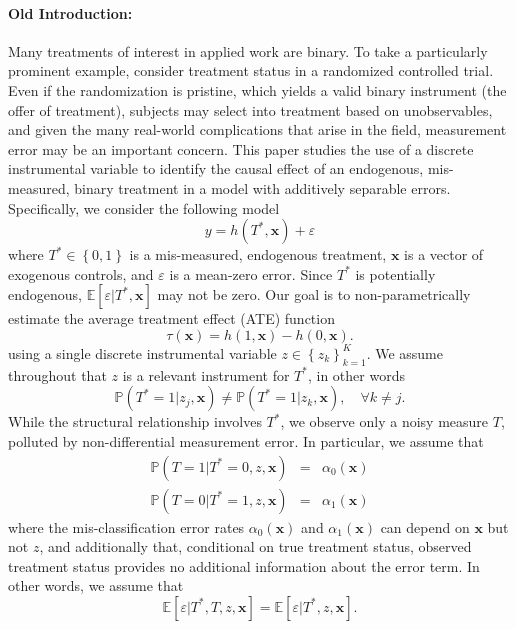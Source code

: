 \paragraph{Old Introduction:} Many treatments of interest in applied work are binary.
To take a particularly prominent example, consider treatment status in a randomized controlled trial.
Even if the randomization is pristine, which yields a valid binary instrument (the offer of treatment), subjects may select into treatment based on unobservables, and given the many real-world complications that arise in the field, measurement error may be an important concern.
This paper studies the use of a discrete instrumental variable to identify the causal effect of an endogenous, mis-measured, binary treatment in a model with additively separable errors.
Specifically, we consider the following model 
\begin{equation}
  y = h(T^*, \mathbf{x}) + \varepsilon
\end{equation}
where $T^*\in \left\{ 0,1 \right\}$ is a mis-measured, endogenous treatment, $\mathbf{x}$ is a vector of exogenous controls, and $\varepsilon$ is a mean-zero error.
Since $T^*$ is potentially endogenous, $\mathbb{E}[\varepsilon|T^*,\mathbf{x}]$ may not be zero.
Our goal is to non-parametrically estimate the average treatment effect (ATE) function
\begin{equation}
  \tau(\mathbf{x}) = h(1,\mathbf{x}) - h(0,\mathbf{x}).
\end{equation}
using a single discrete instrumental variable $z \in \left\{ z_k \right\}_{k=1}^K$.
We assume throughout that $z$ is a relevant instrument for $T^*$, in other words 
\begin{equation}
\mathbb{P}(T^*=1|z_j,\mathbf{x})\neq \mathbb{P}(T^*=1|z_k,\mathbf{x}), \quad \forall k\neq j.
\end{equation}
While the structural relationship involves $T^*$, we observe only a noisy measure $T$, polluted by non-differential measurement error.
In particular, we assume that
\begin{eqnarray}
  \mathbb{P}(T = 1| T^* = 0, z, \mathbf{x})  &=&  \alpha_0(\mathbf{x})\\
  \mathbb{P}(T = 0| T^* = 1, z, \mathbf{x})  &=&  \alpha_1(\mathbf{x})
\end{eqnarray}
where the mis-classification error rates $\alpha_0(\mathbf{x})$ and $\alpha_1(\mathbf{x})$ can depend on $\mathbf{x}$ but not $z$, and additionally that, conditional on true treatment status, observed treatment status provides no additional information about the error term.
In other words, we assume that
\begin{equation}
  \mathbb{E}[\varepsilon|T^*,T,z,\mathbf{x}] =  \mathbb{E}[\varepsilon|T^*,z,\mathbf{x}].
\end{equation}

